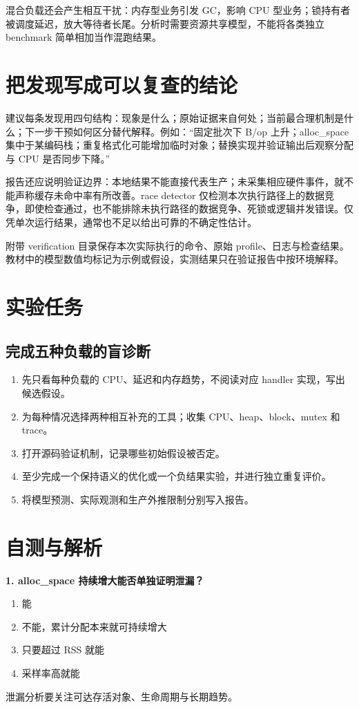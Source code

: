 \documentclass[UTF8,fontset=fandol,openany,11pt]{ctexbook}
\begin{document}
混合负载还会产生相互干扰：内存型业务引发 GC，影响 CPU 型业务；锁持有者被调度延迟，放大等待者长尾。分析时需要资源共享模型，不能将各类独立 benchmark 简单相加当作混跑结果。

\section{把发现写成可以复查的结论}
建议每条发现用四句结构：现象是什么；原始证据来自何处；当前最合理机制是什么；下一步干预如何区分替代解释。例如：“固定批次下 B/op 上升；alloc\_space 集中于某编码栈；重复格式化可能增加临时对象；替换实现并验证输出后观察分配与 CPU 是否同步下降。”

报告还应说明验证边界：本地结果不能直接代表生产；未采集相应硬件事件，就不能声称缓存未命中率有所改善。race detector 仅检测本次执行路径上的数据竞争，即使检查通过，也不能排除未执行路径的数据竞争、死锁或逻辑并发错误。仅凭单次运行结果，通常也不足以给出可靠的不确定性估计。\cite{go-race}

附带 verification 目录保存本次实际执行的命令、原始 profile、日志与检查结果。教材中的模型数值均标记为示例或假设，实测结果只在验证报告中按环境解释。

\section{实验任务}
\subsection*{完成五种负载的盲诊断}
\begin{enumerate}
\item 先只看每种负载的 CPU、延迟和内存趋势，不阅读对应 handler 实现，写出候选假设。

\item 为每种情况选择两种相互补充的工具；收集 CPU、heap、block、mutex 和 trace。

\item 打开源码验证机制，记录哪些初始假设被否定。

\item 至少完成一个保持语义的优化或一个负结果实验，并进行独立重复评价。

\item 将模型预测、实际观测和生产外推限制分别写入报告。

\end{enumerate}
\section{自测与解析}
\noindent\textbf{1. alloc\_space 持续增大能否单独证明泄漏？}
\begin{enumerate}[label=\Alph*.]
\item 能
\item 不能，累计分配本来就可持续增大
\item 只要超过 RSS 就能
\item 采样率高就能
\end{enumerate}
泄漏分析要关注可达存活对象、生命周期与长期趋势。
\end{document}
